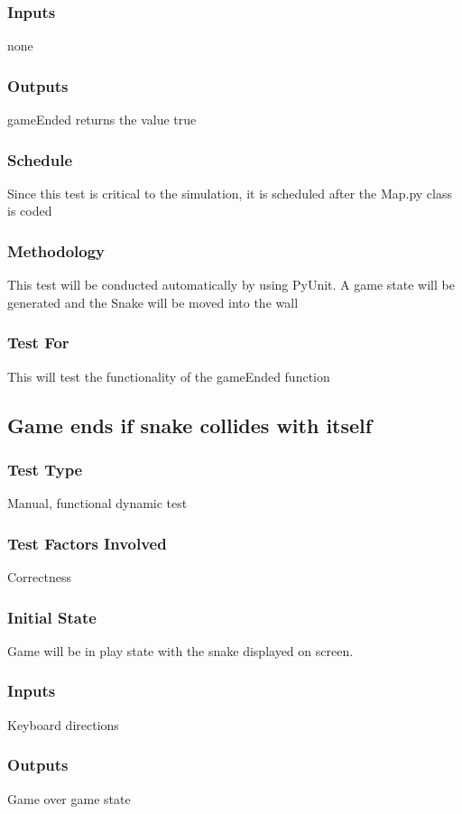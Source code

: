 \documentclass[12pt]{article}
\begin{document}
\subsubsection*{Inputs}
none
\subsubsection*{Outputs}
gameEnded returns the value true
\subsubsection*{Schedule}
Since this test is critical to the simulation, it is scheduled after the Map.py class is coded
\subsubsection*{Methodology}
This test will be conducted automatically by using PyUnit. A game state will be generated and the Snake will be moved into the wall
\subsubsection*{Test For}
This will test the functionality of the gameEnded function \newline

\noindent
\subsection{Game ends if snake collides with itself}
\subsubsection*{Test Type}
Manual, functional dynamic test
\subsubsection*{Test Factors Involved}
Correctness
\subsubsection*{Initial State}
Game will be in play state with the snake displayed on screen.
\subsubsection*{Inputs}
Keyboard directions
\subsubsection*{Outputs}
Game over game state
\end{document}
